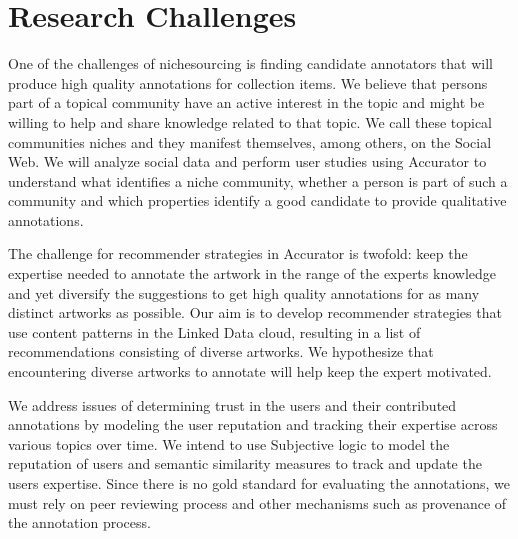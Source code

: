 \section{Research Challenges}
\label{use_case}

One of the challenges of nichesourcing is finding candidate annotators that will produce high quality annotations for collection items. 
We believe that persons part of a topical community have an active interest in the topic and might be willing to help and share knowledge related to that topic. We call these topical communities niches and they manifest themselves, among others, on the Social Web. We will analyze social data and perform user studies using Accurator to understand what identifies a niche community, whether a person is part of such a community and which properties identify a good candidate to provide qualitative annotations. 

The challenge for recommender strategies in Accurator is twofold: keep the expertise needed to annotate the artwork in the range of the experts knowledge and yet diversify the suggestions to get high quality annotations for as many distinct artworks as possible. 
Our aim is to develop recommender strategies that use content patterns in the Linked Data cloud, resulting in a list of recommendations consisting of diverse artworks. 
We hypothesize that encountering diverse artworks to annotate will help keep the expert motivated.

We address issues of determining trust in the users and their contributed annotations by modeling the user reputation and tracking their expertise across various topics over time. We intend to use Subjective logic to model the reputation of users and semantic similarity measures to track and update the users expertise. Since there is no gold standard for evaluating the annotations, we must rely on peer reviewing process and other mechanisms such as provenance of the annotation process.

